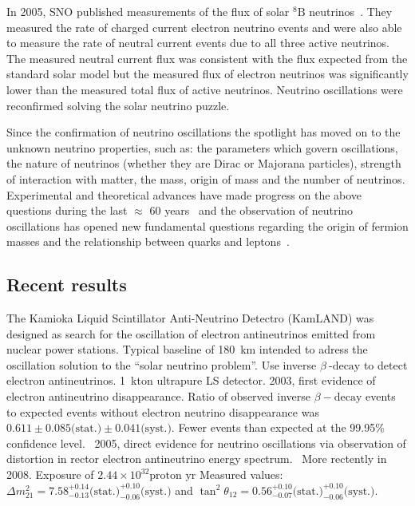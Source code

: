 In 2005, SNO published measurements of the flux of solar $^8\text{B}$
neutrinos~\cite{SNO:PhysRevC.72.055502}. They measured
the rate of charged current electron neutrino events and were also
able to measure the rate of neutral current events due to all three
active neutrinos. The measured neutral current flux was consistent
with the flux expected from the standard solar model but the measured
flux of electron neutrinos was significantly lower than the measured
total flux of active neutrinos. Neutrino oscillations were reconfirmed
solving the solar neutrino puzzle.

Since the confirmation of neutrino oscillations 
the spotlight has moved on to
the unknown neutrino properties, such as:
the parameters which govern oscillations, the nature of
neutrinos (whether they are Dirac or Majorana particles), strength of
interaction with matter, the mass, origin of mass and
the number of neutrinos. 
Experimental and theoretical advances have made progress on the above
questions during the last $\approx$ 60 years~\cite{pdg} and the
observation of neutrino oscillations has opened new fundamental
questions regarding the origin of fermion masses and the relationship
between quarks and leptons~\cite{Mohapatra:2005wg}. 



\subsection{Recent results}

The Kamioka Liquid Scintillator Anti-Neutrino Detectro (KamLAND) was 
designed as search for the oscillation of electron antineutrinos
emitted from nuclear power stations. 
Typical baseline of 180~km intended to adress the oscillation
solution to the ``solar neutrino problem''.
Use inverse $\beta~\text{-decay}$ to detect electron
antineutrinos. 1~kton ultrapure LS detector.
2003, first evidence of electron antineutrino disappearance. Ratio of 
observed inverse $\beta-\text{decay}$ events to expected events
without electron neutrino disappearance
was $0.611 \pm 0.085\text{(stat.)} \pm
0.041\text{(syst.)}$. Fewer events than expected at the 99.95\%
confidence level.~\cite{Kamland:PhysRevLett.90.021802}  
2005, direct evidence for neutrino oscillations via observation of 
distortion in rector electron antineutrino energy
spectrum.~\cite{Kamland:PhysRevLett.94.081801} 
More rectently in 2008. 
Exposure of $2.44 \times 10^{32} \text{proton yr}$
Measured values: 
$\Delta m^2_{21} =
7.58^{+0.14}_{-0.13}\text{(stat.)}^{+0.10}_{-0.06}\text{(syst.)}$  and
$\tan^2\theta_{12} =
0.56^{+0.10}_{-0.07}\text{(stat.)}^{+0.10}_{-0.06}
\text{(syst.)}$.~\cite{Kamland:PhysRevLett.100.221803}  

